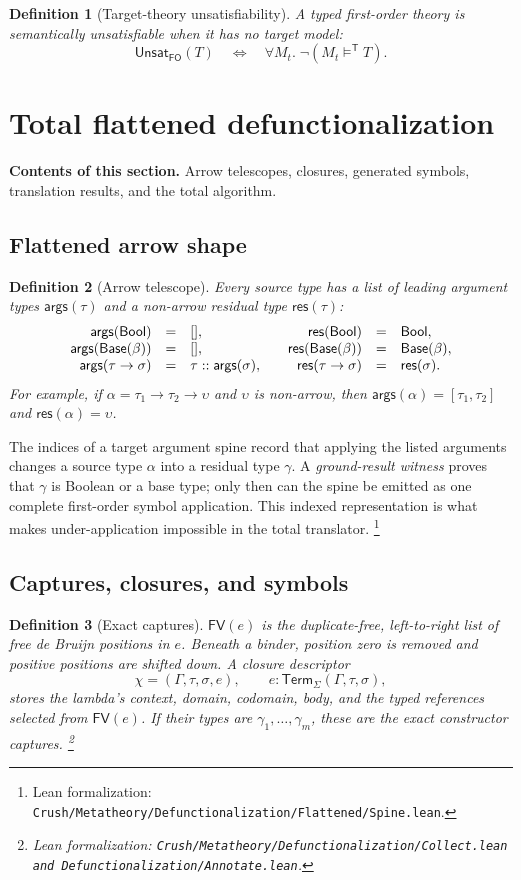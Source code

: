 \documentclass[11pt]{article}
\newtheorem{definition}{Definition}[section]
\theoremstyle{remark}
\newcommand{\leanfile}[1]{\footnote{Lean formalization: \texttt{Crush/Metatheory/#1}.}}
\newcommand{\leanfiles}[1]{\footnote{Lean formalization: \texttt{Crush/Metatheory/#1}.}}
\newcommand{\sectioncontents}[1]{%
  \smallskip\noindent\textbf{Contents of this section.} #1\par\medskip}
\newcommand{\Bool}{\mathsf{Bool}}
\newcommand{\Base}{\mathsf{Base}}
\newcommand{\satt}{\models^{\mathsf T}}
\newcommand{\unsat}{\mathsf{Unsat}}
\newcommand{\HOTerm}[4]{#3:\mathsf{Term}_{#1}(#2,#4)}
\newcommand{\args}{\mathsf{args}}
\newcommand{\res}{\mathsf{res}}
\newcommand{\FV}{\mathsf{FV}}
\begin{document}
\begin{definition}[Target-theory unsatisfiability]
A typed first-order theory is semantically unsatisfiable when it has no target
model:
\[
 \unsat_{\mathsf{FO}}(T)
 \quad\Longleftrightarrow\quad
 \forall M_t.\;\neg(M_t\satt T).
\]
\end{definition}

\section{Total flattened defunctionalization}
\sectioncontents{Arrow telescopes, closures, generated symbols, translation results, and the total algorithm.}

\subsection{Flattened arrow shape}

\begin{definition}[Arrow telescope]
Every source type has a list of leading argument types $\args(\tau)$ and a
non-arrow residual type $\res(\tau)$:
\[
\begin{array}{rcl@{\qquad}rcl}
 \args(\Bool)&=&[], & \res(\Bool)&=&\Bool,\\
 \args(\Base(\beta))&=&[], & \res(\Base(\beta))&=&\Base(\beta),\\
 \args(\tau\to\sigma)&=&\tau::\args(\sigma), &
 \res(\tau\to\sigma)&=&\res(\sigma).
\end{array}
\]
For example, if $\alpha=\tau_1\to\tau_2\to\upsilon$ and $\upsilon$ is
non-arrow, then $\args(\alpha)=[\tau_1,\tau_2]$ and
$\res(\alpha)=\upsilon$.
\end{definition}

The indices of a target argument spine record that applying the listed
arguments changes a source type $\alpha$ into a residual type $\gamma$. A
\emph{ground-result witness} proves that $\gamma$ is Boolean or a base type;
only then can the spine be emitted as one complete first-order symbol
application. This indexed representation is what makes under-application
impossible in the total translator.
\leanfile{Defunctionalization/Flattened/Spine.lean}

\subsection{Captures, closures, and symbols}
\label{sec:flattened-symbols}

\begin{definition}[Exact captures]
$\FV(e)$ is the duplicate-free, left-to-right list of free de Bruijn positions
in $e$. Beneath a binder, position zero is removed and positive positions are
shifted down. A closure descriptor
\[
 \chi=(\Gamma,\tau,\sigma,e),
 \qquad \HOTerm{\Sigma}{\Gamma,\tau}{e}{\sigma},
\]
stores the lambda's context, domain, codomain, body, and the typed references
selected from $\FV(e)$. If their types are
$\gamma_1,\ldots,\gamma_m$, these are the exact constructor captures.
\leanfiles{Defunctionalization/Collect.lean and Defunctionalization/Annotate.lean}
\end{definition}
\end{document}

